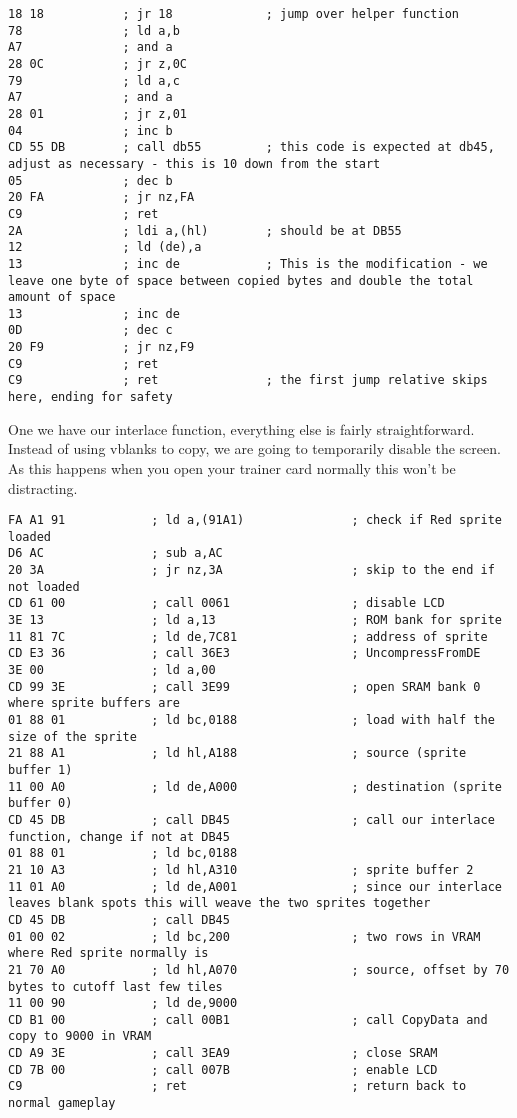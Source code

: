 \documentclass[../main.tex]{subfiles}
\begin{document}
    \begin{verbatim}
18 18           ; jr 18             ; jump over helper function
78              ; ld a,b
A7              ; and a
28 0C           ; jr z,0C
79              ; ld a,c
A7              ; and a
28 01           ; jr z,01
04              ; inc b
CD 55 DB        ; call db55         ; this code is expected at db45, adjust as necessary - this is 10 down from the start
05              ; dec b
20 FA           ; jr nz,FA
C9              ; ret
2A              ; ldi a,(hl)        ; should be at DB55
12              ; ld (de),a
13              ; inc de            ; This is the modification - we leave one byte of space between copied bytes and double the total amount of space
13              ; inc de
0D              ; dec c
20 F9           ; jr nz,F9
C9              ; ret
C9              ; ret               ; the first jump relative skips here, ending for safety
    \end{verbatim}

    One we have our interlace function, everything else is fairly straightforward.  Instead of using vblanks to copy, we are going to temporarily disable the screen.  As this happens when you open your trainer card normally this won't be distracting.

    \begin{verbatim}
FA A1 91            ; ld a,(91A1)               ; check if Red sprite loaded
D6 AC               ; sub a,AC
20 3A               ; jr nz,3A                  ; skip to the end if not loaded
CD 61 00            ; call 0061                 ; disable LCD
3E 13               ; ld a,13                   ; ROM bank for sprite
11 81 7C            ; ld de,7C81                ; address of sprite
CD E3 36            ; call 36E3                 ; UncompressFromDE
3E 00               ; ld a,00
CD 99 3E            ; call 3E99                 ; open SRAM bank 0 where sprite buffers are
01 88 01            ; ld bc,0188                ; load with half the size of the sprite
21 88 A1            ; ld hl,A188                ; source (sprite buffer 1)
11 00 A0            ; ld de,A000                ; destination (sprite buffer 0)
CD 45 DB            ; call DB45                 ; call our interlace function, change if not at DB45
01 88 01            ; ld bc,0188
21 10 A3            ; ld hl,A310                ; sprite buffer 2
11 01 A0            ; ld de,A001                ; since our interlace leaves blank spots this will weave the two sprites together
CD 45 DB            ; call DB45
01 00 02            ; ld bc,200                 ; two rows in VRAM where Red sprite normally is
21 70 A0            ; ld hl,A070                ; source, offset by 70 bytes to cutoff last few tiles
11 00 90            ; ld de,9000
CD B1 00            ; call 00B1                 ; call CopyData and copy to 9000 in VRAM
CD A9 3E            ; call 3EA9                 ; close SRAM
CD 7B 00            ; call 007B                 ; enable LCD
C9                  ; ret                       ; return back to normal gameplay
    \end{verbatim}
\end{document}
